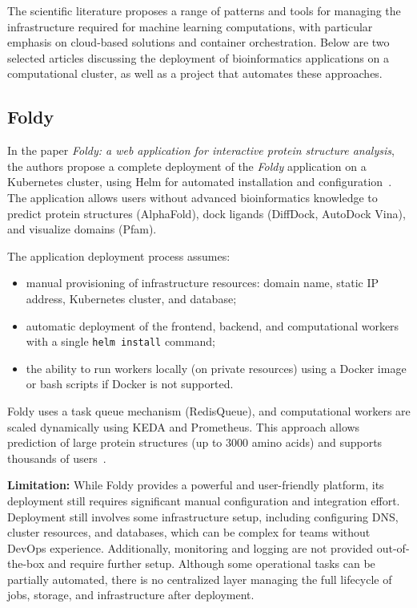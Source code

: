 The scientific literature proposes a range of patterns and tools for managing the infrastructure required for machine learning computations, with particular emphasis on cloud-based solutions and container orchestration.
Below are two selected articles discussing the deployment of bioinformatics applications on a computational cluster, as well as a project that automates these approaches.

\subsection{Foldy}

In the paper \textit{Foldy: a web application for interactive protein structure analysis}, the authors propose a complete deployment of the \textit{Foldy} application on a Kubernetes cluster, using Helm for automated installation and configuration~\cite{foldy,helm}.
The application allows users without advanced bioinformatics knowledge to predict protein structures (AlphaFold), dock ligands (DiffDock, AutoDock Vina), and visualize domains (Pfam).

The application deployment process assumes:
\begin{itemize}
    \item manual provisioning of infrastructure resources: domain name, static IP address, Kubernetes cluster, and database;
    \item automatic deployment of the frontend, backend, and computational workers with a single \texttt{helm install} command;
    \item the ability to run workers locally (on private resources) using a Docker image or bash scripts if Docker is not supported.
\end{itemize}

Foldy uses a task queue mechanism (RedisQueue), and computational workers are scaled dynamically using KEDA and Prometheus.
This approach allows prediction of large protein structures (up to 3000 amino acids) and supports thousands of users~\cite{foldy}.

\textbf{Limitation:} While Foldy provides a powerful and user-friendly platform, its deployment still requires significant manual configuration and integration effort.
Deployment still involves some infrastructure setup, including configuring DNS, cluster resources, and databases, which can be complex for teams without DevOps experience.
Additionally, monitoring and logging are not provided out-of-the-box and require further setup.
Although some operational tasks can be partially automated, there is no centralized layer managing the full lifecycle of jobs, storage, and infrastructure after deployment.

